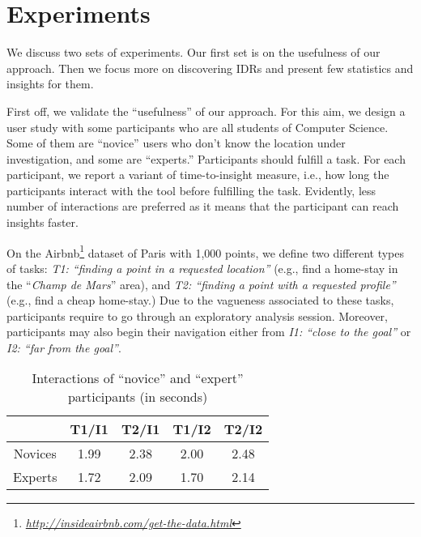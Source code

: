 \documentclass[sigconf,edbt]{acmart-edbt2019}
\begin{document}
\section{Experiments}
\label{sec:experiments}

We discuss two sets of experiments. Our first set is on the usefulness of our approach. Then we focus more on discovering IDRs and present few statistics and insights for them. 

\vspace{2pt}
First off, we validate the ``usefulness'' of our approach. For this aim, we design a user study with some participants who are all students of Computer Science. Some of them are ``novice'' users who don't know the location under investigation, and some are ``experts.'' Participants should fulfill a task. For each participant, we report a variant of time-to-insight measure, i.e., how long the participants interact with the tool before fulfilling the task. Evidently, less number of interactions are preferred as it means that the participant can reach insights faster.

\vspace{2pt}
On the \textsf{Airbnb}\footnote{\it \url{http://insideairbnb.com/get-the-data.html}} dataset of Paris with 1,000 points, we define two different types of tasks: {\em T1: ``finding a point in a requested location''} (e.g., find a home-stay in the ``\textit{Champ de Mars}'' area), and {\em T2: ``finding a point with a requested profile''} (e.g., find a cheap home-stay.) Due to the vagueness associated to these tasks, participants require to go through an exploratory analysis session. Moreover, participants may also begin their navigation either from {\em I1: ``close to the goal''} or {\em I2: ``far from the goal''}. 


\begin{table}[t]
\centering
\caption{Interactions of ``novice'' and ``expert'' participants (in seconds)}
\label{tbl:novice}
\begin{tabular}{c|c|c|c|c|}
\cline{2-5}
                                       	& \textbf{T1/I1} 	& \textbf{T2/I1} 	& \textbf{T1/I2}	& \textbf{T2/I2}	\\ \hline
\multicolumn{1}{|c|}{Novices} 				& 1.99            	& 2.38	          	& 2.00              & 2.48              \\ \hline
\multicolumn{1}{|c|}{Experts} 				& 1.72            	& 2.09	          	& 1.70              & 2.14              \\ \hline
\end{tabular}
\end{table}
\end{document}

